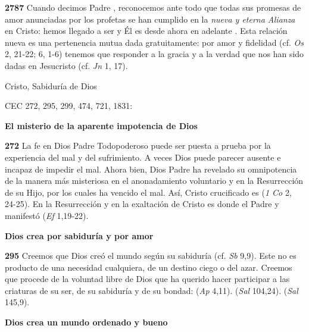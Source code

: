 \begin{body}
\begin{body}
\textbf{2787} Cuando decimos Padre , reconocemos ante todo que todas sus promesas de amor anunciadas por los profetas se han cumplido en la \emph{nueva y eterna Alianza} en Cristo: hemos llegado a ser  y Él es desde ahora en adelante . Esta relación nueva es una pertenencia mutua dada gratuitamente: por amor y fidelidad (cf. \emph{Os} 2, 21-22; 6, 1-6) tenemos que responder a la gracia y a la verdad que nos han sido dadas en Jesucristo (cf. \emph{Jn} 1, 17).

Cristo, Sabiduría de Dios

CEC 272, 295, 299, 474, 721, 1831:

\textbf{El misterio de la aparente impotencia de Dios}

\textbf{272} La fe en Dios Padre Todopoderoso puede ser puesta a prueba por la experiencia del mal y del sufrimiento. A veces Dios puede parecer ausente e incapaz de impedir el mal. Ahora bien, Dios Padre ha revelado su omnipotencia de la manera más misteriosa en el anonadamiento voluntario y en la Resurrección de su Hijo, por los cuales ha vencido el mal. Así, Cristo crucificado es  (\emph{1 Co} 2, 24-25). En la Resurrección y en la exaltación de Cristo es donde el Padre  y manifestó  (\emph{Ef} 1,19-22).

\textbf{Dios crea por sabiduría y por amor}

\textbf{295} Creemos que Dios creó el mundo según su sabiduría (cf. \emph{Sb} 9,9). Este no es producto de una necesidad cualquiera, de un destino ciego o del azar. Creemos que procede de la voluntad libre de Dios que ha querido hacer participar a las criaturas de su ser, de su sabiduría y de su bondad:  (\emph{Ap} 4,11).  (\emph{Sal} 104,24).  (\emph{Sal} 145,9).

\textbf{Dios crea un mundo ordenado y bueno}


\end{body}
\end{body}

